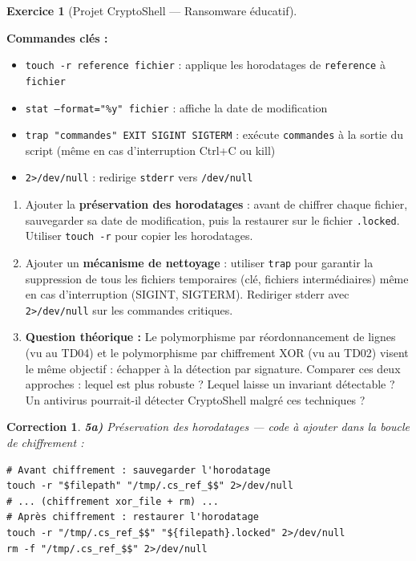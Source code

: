 \documentclass[a4paper,11pt]{article}
\theoremstyle{plain}
\newtheorem{correction}{Correction}
\theoremstyle{definition}
\newtheorem{exercice}{Exercice}
\begin{document}
\begin{exercice}[Projet CryptoShell --- Ransomware éducatif]
\begin{rappel}
\medskip
\textbf{Commandes clés :}
\begin{itemize}
    \item \texttt{touch -r reference fichier} : applique les horodatages de \texttt{reference} à \texttt{fichier}
    \item \texttt{stat --format="\%y" fichier} : affiche la date de modification
    \item \texttt{trap "commandes" EXIT SIGINT SIGTERM} : exécute \texttt{commandes} à la sortie du script (même en cas d'interruption Ctrl+C ou kill)
    \item \texttt{2>/dev/null} : redirige \texttt{stderr} vers \texttt{/dev/null}
\end{itemize}
\end{rappel}

\begin{enumerate}
\item[\textbf{5a)}] Ajouter la \textbf{préservation des horodatages} : avant de chiffrer chaque fichier, sauvegarder sa date de modification, puis la restaurer sur le fichier \texttt{.locked}. Utiliser \texttt{touch -r} pour copier les horodatages.

\item[\textbf{5b)}] Ajouter un \textbf{mécanisme de nettoyage} : utiliser \texttt{trap} pour garantir la suppression de tous les fichiers temporaires (clé, fichiers intermédiaires) même en cas d'interruption (SIGINT, SIGTERM). Rediriger stderr avec \texttt{2>/dev/null} sur les commandes critiques.

\item[\textbf{5c)}] \textbf{Question théorique :} Le polymorphisme par réordonnancement de lignes (vu au TD04) et le polymorphisme par chiffrement XOR (vu au TD02) visent le même objectif : échapper à la détection par signature. Comparer ces deux approches : lequel est plus robuste ? Lequel laisse un invariant détectable ? Un antivirus pourrait-il détecter CryptoShell malgré ces techniques ?
\end{enumerate}

\begin{correction}

\textbf{5a)} Préservation des horodatages --- code à ajouter dans la boucle de chiffrement :
\begin{lstlisting}[title=Préservation des horodatages (5a)]
# Avant chiffrement : sauvegarder l'horodatage
touch -r "$filepath" "/tmp/.cs_ref_$$" 2>/dev/null
# ... (chiffrement xor_file + rm) ...
# Après chiffrement : restaurer l'horodatage
touch -r "/tmp/.cs_ref_$$" "${filepath}.locked" 2>/dev/null
rm -f "/tmp/.cs_ref_$$" 2>/dev/null
\end{lstlisting}


\end{correction}
\end{exercice}
\end{document}
